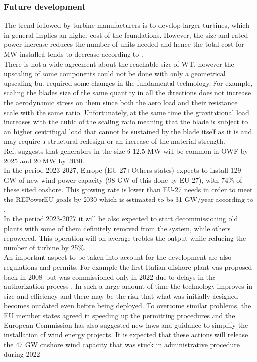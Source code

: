 \subsubsection{Future development}
The trend followed by turbine manufacturers is to develop larger turbines, which in general implies an higher cost of the foundations. However, the size and rated power increase reduces the number of units needed and hence the total cost for $\si{\mega\watt}$ installed tends to decrease according to \cite{current_staus_and_future_trends_of_offshore_wind_power_in_europe}.\\
There is not a wide agreement about the reachable size of WT, however the upscaling of some components could not be done with only a geometrical upscaling but required some changes in the fundamental technology. For example, scaling the blades size of the same quantity in all the directions does not increase the aerodynamic stress on them since both the aero load and their resistance scale with the same ratio. Unfortunately, at the same time the gravitational load increases with the cubic of the scaling ratio meaning that the blade is subject to an higher centrifugal load that cannot be sustained by the blade itself as it is and may require a structural redesign or an increase of the material strength. \\
Ref. \cite{current_staus_and_future_trends_of_offshore_wind_power_in_europe} suggests that generators in the size 6-12.5 $\si{\mega\watt}$ will be common in OWF by 2025 and 20 $\si{\mega\watt}$ by 2030.\\
In the period 2023-2027, Europe (EU-27+Others states) expects to install 129 $\si{\giga\watt}$ of new wind power capacity (98 $\si{\giga\watt}$ of this done by EU-27), with 74\% of these sited onshore. This growing rate is lower than EU-27 needs in order to meet the REPowerEU goals by 2030 which is estimated to be 31 GW/year according to \cite{wind_europe_data_2022}. \\
In the period 2023-2027 it will be also expected to start decommissioning old plants with some of them definitely removed from the system, while others repowered. This operation will on average trebles the output while reducing the number of turbine by 25\%. \\
An important aspect to be taken into account for the development are also regulations and permits. For example the first Italian offshore plant was proposed back in 2008, but was commissioned only in 2022 due to delays in the authorization process \cite{il_post}. In such a large amount of time the technology improves in size and efficiency and there may be the risk that what was initially designed becomes outdated even before being deployed. To overcome similar problems, the EU member states agreed in speeding up the permitting procedures and the European Commission has also suggested new laws and guidance to simplify the installation of wind energy projects. It is expected that these actions will release the 47 $\si{\giga\watt}$ onshore wind capacity that was stuck in administrative procedure during 2022 \cite{wind_europe_data_2022}.  